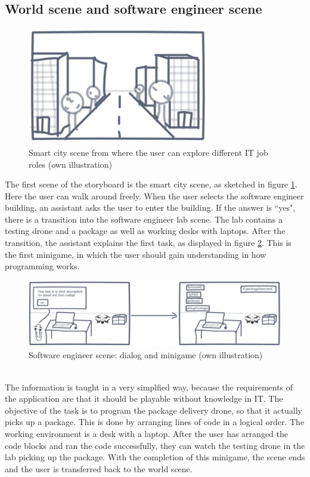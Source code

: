 \subsection{World scene and software engineer scene}
\begin{figure}[h!]
  \includegraphics[width=8cm]{kapitel/storyboard/smart-city.pdf}
  \centering
  \caption{Smart city scene from where the user can explore different IT job roles (own illustration)}
  \label{fig:smartcity}
\end{figure}
The first scene of the storyboard is the smart city scene, as sketched in figure \ref{fig:smartcity}. Here the user can walk around freely. When the user selects the software engineer building, an assistant asks the user to enter the building. If the answer is ``yes", there is a transition into the software engineer lab scene. The lab contains a testing drone and a package as well as working desks with laptops. After the transition, the assistant explains the first task, as displayed in figure \ref{fig:sescene}. This is the first minigame, in which the user should gain understanding in how programming works.
\begin{figure}[h!]
  \includegraphics[width=16cm]{kapitel/storyboard/se-scene.pdf}
  \centering
  \caption{Software engineer scene: dialog and minigame (own illustration)}
  \label{fig:sescene}
\end{figure}
\\The information is taught in a very simplfied way, because the requirements of the application are that it should be playable without knowledge in IT. The objective of the task is to program the package delivery drone, so that it actually picks up a package. This is done by arranging lines of code in a logical order. The working environment is a desk with a laptop. After the user has arranged the code blocks and ran the code successfully, they can watch the testing drone in the lab picking up the package. With the completion of this minigame, the scene ends and the user is transferred back to the world scene.
